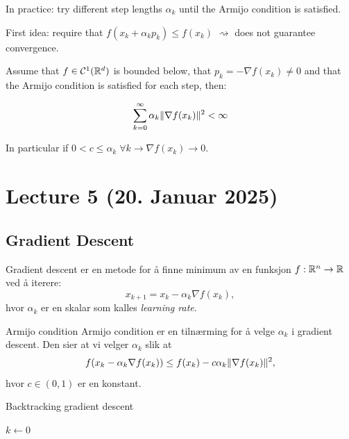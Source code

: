 In practice: try different step lengths  \(\alpha_k\) until the Armijo condition is satisfied.

First idea: require that  \(f(x_k + \alpha_k p_k) \leq f(x_k)\)  \(\rightsquigarrow\) does not guarantee convergence.

\begin{lemma}{}{}
  Assume that  \(f \in \mathcal{C}^1(\mathbb{R}^d)\) is bounded below, that  \(p_k = - \nabla f(x_k) \neq 0\) and that the Armijo condition is satisfied for each step, then:

  \[
    \sum_{k=0}^{\infty} \alpha_k \lVert\nabla f(x_k)\rVert^2 < \infty
  \]

  In particular if  \(0 < c \leq \alpha_k \; \forall k \rightarrow \nabla f(x_k) \rightarrow 0\).
\end{lemma}



\section{Lecture 5 (20. Januar 2025)}

\subsection*{Gradient Descent}


Gradient descent er en metode for å finne minimum av en funksjon  \(f: \mathbb{R}^n \to \mathbb{R}\) ved å iterere:
\[
  x_{k+1} = x_k - \alpha_k \nabla f(x_k),
\]
hvor  \(\alpha_k\) er en skalar som kalles \emph{learning rate}.

\begin{remark}{Armijo condition}{}
  Armijo condition er en tilnærming for å velge  \(\alpha_k\) i gradient descent. Den sier at vi velger  \(\alpha_k\) slik at
  \[
    f(x_k - \alpha_k \nabla f(x_k)) \leq f(x_k) - c \alpha_k \lVert\nabla f(x_k)\rVert^2,
  \]
  hvor  \(c \in (0, 1)\) er en konstant.
\end{remark}


\begin{algorithm}
  \caption{Backtracking gradient descent}
  \SetAlgoLined
  \(k \gets 0\)\;
\end{algorithm}


